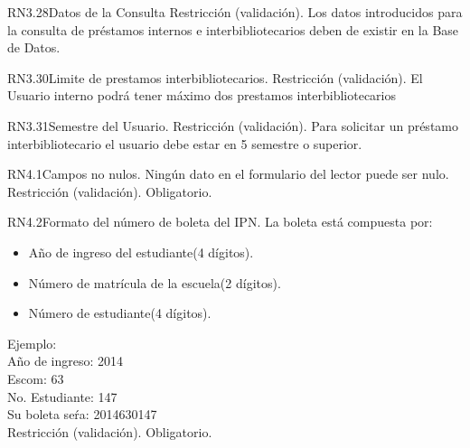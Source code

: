 \begin{BussinesRule}{RN3.28}{Datos de la Consulta} 
	\BRitem[Tipo:] Restricción (validación).
	\BRitem[Descripción:]Los datos introducidos para la consulta de préstamos internos e interbibliotecarios deben de existir en la Base de Datos.
\end{BussinesRule}

\begin{BussinesRule}{RN3.30}{Limite de prestamos interbibliotecarios.} 
	\BRitem[Tipo:] Restricción (validación).
	\BRitem[Descripción:]El Usuario interno podrá tener máximo dos prestamos interbibliotecarios
\end{BussinesRule}

\begin{BussinesRule}{RN3.31}{Semestre del Usuario.} 
	\BRitem[Tipo:] Restricción (validación).
	\BRitem[Descripción:]Para solicitar un préstamo interbibliotecario el usuario debe estar en 5 semestre o superior.
\end{BussinesRule}

\begin{BussinesRule}{RN4.1}{Campos no nulos.} 
	\BRitem[Descripción:] Ningún dato en el formulario del lector puede ser nulo.
	\BRitem[Tipo:] Restricción (validación).
	\BRitem[Nivel:] Obligatorio.
\end{BussinesRule}


\begin{BussinesRule}{RN4.2}{Formato del número de boleta del IPN.}
	\BRitem[Descripción:] La boleta está compuesta por:
		\begin{itemize} 
			\item Año de ingreso del estudiante(4 dígitos).
			\item Número de matrícula de la escuela(2 dígitos).
			\item Número de estudiante(4 dígitos).
		\end{itemize}
	Ejemplo:\\
		Año de ingreso: 2014\\
		Escom: 63\\
		No. Estudiante: 147\\
		Su boleta seŕa: 2014630147\\
	\BRitem[Tipo:] Restricción (validación).
	\BRitem[Nivel:] Obligatorio.
\end{BussinesRule}

